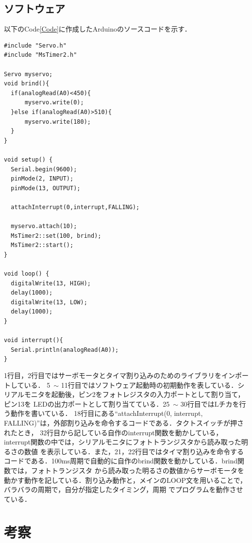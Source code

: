 \documentclass[a4paper,11pt]{jsarticle}
\begin{document}
\subsection{ソフトウェア}
以下のCode\ref{Code}に作成したArduinoのソースコードを示す．
\begin{lstlisting}[caption=Arduinoで作成したCode, label=Code]
#include "Servo.h"
#include "MsTimer2.h"

Servo myservo;
void brind(){
  if(analogRead(A0)<450){
      myservo.write(0); 
  }else if(analogRead(A0)>510){
      myservo.write(180);
  }
}

void setup() {
  Serial.begin(9600);
  pinMode(2, INPUT);
  pinMode(13, OUTPUT);
  
  attachInterrupt(0,interrupt,FALLING);
  
  myservo.attach(10);
  MsTimer2::set(100, brind);
  MsTimer2::start();
}

void loop() {
  digitalWrite(13, HIGH);  
  delay(1000);  
  digitalWrite(13, LOW);
  delay(1000);               
}

void interrupt(){
  Serial.println(analogRead(A0));
}
\end{lstlisting}\par
1行目，2行目ではサーボモータとタイマ割り込みのためのライブラリをインポートしている．
5\ $\sim$ 11行目ではソフトウェア起動時の初期動作を表している．シリアルモニタを起動後，ピン2をフォトレジスタの入力ポートとして割り当て，ピン13を
LEDの出力ポートとして割り当てている．25\ $\sim$ 30行目ではLチカを行う動作を書いている．
18行目にある``attachInterrupt(0, interrupt, FALLING)''は，外部割り込みを命令するコードである．タクトスイッチが押されたとき，
32行目から記している自作のinterrupt関数を動かしている，interrupt関数の中では，シリアルモニタにフォトトランジスタから読み取った明るさの数値
を表示している．また，21，22行目ではタイマ割り込みを命令するコードである．100ms周期で自動的に自作のbrind関数を動かしている．brind関数では，フォトトランジスタ
から読み取った明るさの数値からサーボモータを動かす動作を記している．割り込み動作と，メインのLOOP文を用いることで，バラバラの周期で，自分が指定したタイミング，周期
でプログラムを動作させている．

\section{考察}
\end{document}

